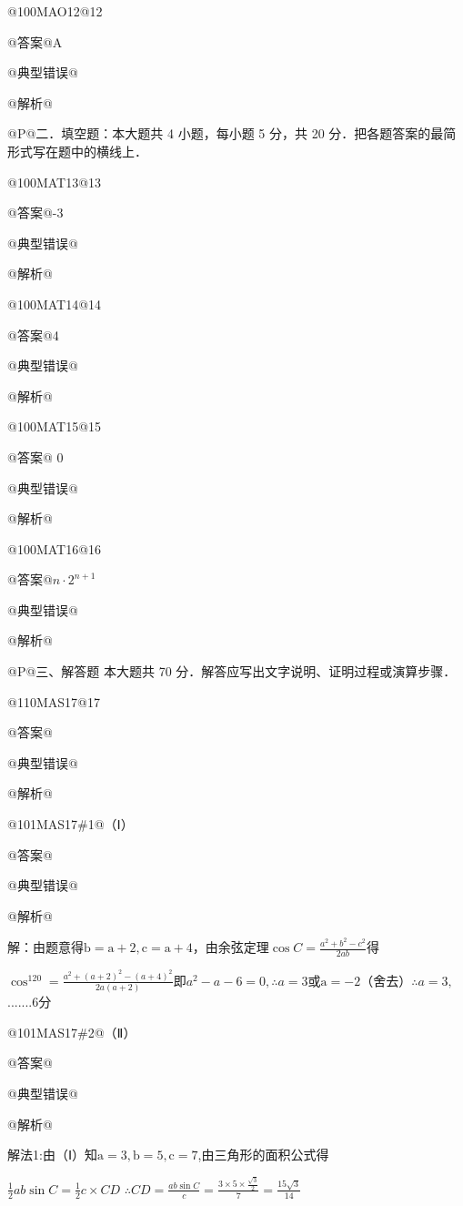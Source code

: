\documentclass{scrbook}
\begin{document}
@100MA{\textbar}O12@12

@答案@A

@典型错误@

@解析@

@P@二．填空题：本大题共 4 小题，每小题 5 分，共 20 分．把各题答案的最简形式写在题中的横线上．

@100MA{\textbar}T13@13

@答案@-3

@典型错误@

@解析@



@100MA{\textbar}T14@14

@答案@4

@典型错误@

@解析@



@100MA{\textbar}T15@15

@答案@ 0

@典型错误@

@解析@

@100MA{\textbar}T16@16

@答案@$n\cdot 2^{n+1}$

@典型错误@

@解析@

@P@三、解答题 本大题共 70 分．解答应写出文字说明、证明过程或演算步骤．

@110MA{\textbar}S17@17

@答案@

@典型错误@

@解析@

@101MA{\textbar}S17\#1@（Ⅰ）

@答案@

@典型错误@

@解析@

解：由题意得$\mathrm{b}=\mathrm{a}+2,\mathrm{c}=\mathrm{a}+4$，由余弦定理$\cos C=\frac{a^{2}+b^{2}- c^{2}}{2ab}$得

$\cos ^{120}=\frac{a^{2}+(a+2)^{2}- (a+4)^{2}}{2a(a+2)}$即$a^{2}- a- 6=0,\therefore a=3$或$\mathrm{a}=-2$（舍去）$\therefore a=3,$.......6分

@101MA{\textbar}S17\#2@（Ⅱ）

@答案@

@典型错误@

@解析@

解法1:由（Ⅰ）知$\mathrm{a}=3,\mathrm{b}=5,\mathrm{c}=7$,由三角形的面积公式得

$\frac{1}{2}ab\sin C=\frac{1}{2}c\times CD$ $\therefore CD=\frac{ab\sin C}{c}=\frac{3\times 5\times \frac{\sqrt{3}}{2}}{7}=\frac{15\sqrt{3}}{14}$
\end{document}
